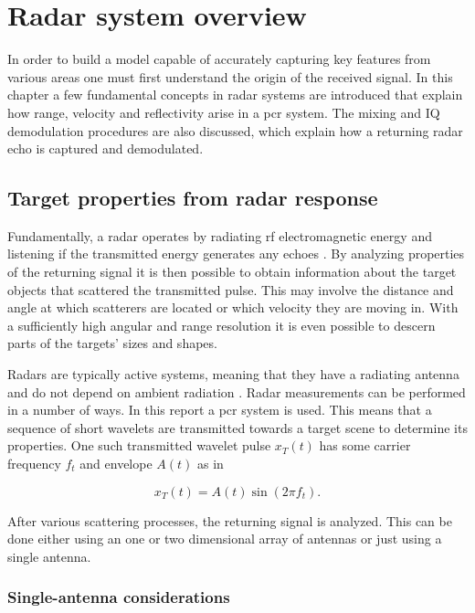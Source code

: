 \chapter{Radar system overview}

In order to build a model capable of accurately capturing key features from various areas one must first understand the origin of the received signal. In this chapter a few fundamental concepts in radar systems are introduced that explain how range, velocity and reflectivity arise in a \gls{pcr} system. The mixing and IQ demodulation procedures are also discussed, which explain how a returning radar echo is captured and demodulated. 

\section{Target properties from radar response}
Fundamentally, a radar operates by radiating \gls{rf} electromagnetic energy and listening if the transmitted energy generates any echoes \citep{skolnik_2009}. By analyzing properties of the returning signal it is then possible to obtain information about the target objects that scattered the transmitted pulse. This may involve the distance and angle at which scatterers are located or which velocity they are moving in. With a sufficiently high angular and range resolution it is even possible to descern parts of the targets' sizes and shapes.  

Radars are typically active systems, meaning that they have a radiating antenna and do not depend on ambient radiation \citep{richards_2014}. Radar measurements can be performed in a number of ways. In this report a \gls{pcr} system is used. This means that a sequence of short wavelets are transmitted towards a target scene to determine its properties. One such transmitted wavelet pulse $x_T(t)$ has some carrier frequency $f_t$ and envelope $A(t)$ as in

\begin{equation}\label{eq:trans}
	x_T(t)
	= A(t)\sin(2\pi f_t).
\end{equation}

After various scattering processes, the returning signal is analyzed. This can be done either using an one or two dimensional array of antennas or just using a single antenna. 

\subsection{Single-antenna considerations}

